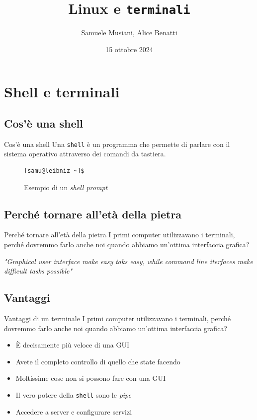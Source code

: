 \documentclass{beamer}
\title{Linux e \texttt{terminali}}
\author{Samuele Musiani, Alice Benatti}
\institute{Università di Bologna, corso di Laurea in Informatica}
\date{15 ottobre 2024}
\begin{document}
\begin{frame} 
  \titlepage
\end{frame}

\section{Shell e terminali}

\subsection{Cos'è una shell}
\begin{frame}[fragile]{Cos'è una shell}
  Una \texttt{shell} è un programma che permette di parlare con il sistema 
  operativo attraverso dei comandi da tastiera.
  \pause

  \begin{figure}
        \begin{lstlisting}
[samu@leibniz ~]$
    \end{lstlisting}
    \caption{Esempio di un \textit{shell prompt}}
  \end{figure}
\end{frame}

\subsection{Perché tornare all'età della pietra}
\begin{frame}{Perché tornare all'età della pietra}
  I primi computer utilizzavano i terminali, perché dovremmo farlo anche noi
  quando abbiamo un'ottima interfaccia grafica?\bigskip
  \pause

  \textit{"Graphical user interface make easy taks easy, while command line 
  iterfaces make difficult tasks possible"}
\end{frame}

\subsection{Vantaggi}
\begin{frame}{Vantaggi di un terminale}
  I primi computer utilizzavano i terminali, perché dovremmo farlo anche noi
  quando abbiamo un'ottima interfaccia grafica?\bigskip

  \begin{itemize}
    \item <1-> È decisamente più veloce di una GUI
    \item <2-> Avete il completo controllo di quello che state facendo
    \item <3-> Moltissime cose non si possono fare con una GUI
    \item <4-> Il vero potere della \texttt{shell} sono le \textit{pipe}
    \item <5-> Accedere a server e configurare servizi
  \end{itemize}
\end{frame}
\end{document}
